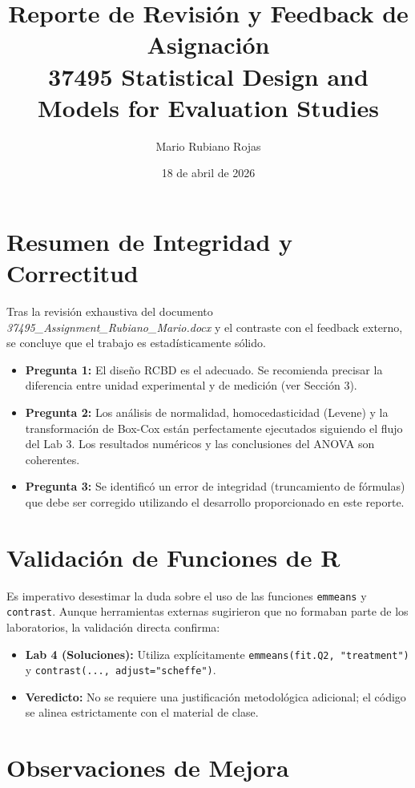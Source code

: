 \documentclass[11pt,a4paper]{article}
\title{Reporte de Revisi\'on y Feedback de Asignaci\'on \\ \large 37495 Statistical Design and Models for Evaluation Studies}
\author{Mario Rubiano Rojas}
\date{18 de abril de 2026}
\begin{document}
\maketitle

\section{Resumen de Integridad y Correctitud}
Tras la revisi\'on exhaustiva del documento \textit{37495\_Assignment\_Rubiano\_Mario.docx} y el contraste con el feedback externo, se concluye que el trabajo es estad\'isticamente s\'olido.

\begin{itemize}
    \item \textbf{Pregunta 1:} El dise\~no RCBD es el adecuado. Se recomienda precisar la diferencia entre unidad experimental y de medici\'on (ver Secci\'on 3).
    \item \textbf{Pregunta 2:} Los an\'alisis de normalidad, homocedasticidad (Levene) y la transformaci\'on de Box-Cox est\'an perfectamente ejecutados siguiendo el flujo del Lab 3. Los resultados num\'ericos y las conclusiones del ANOVA son coherentes.
    \item \textbf{Pregunta 3:} Se identific\'o un error de integridad (truncamiento de f\'ormulas) que debe ser corregido utilizando el desarrollo proporcionado en este reporte.
\end{itemize}

\section{Validaci\'on de Funciones de R}
Es imperativo desestimar la duda sobre el uso de las funciones \texttt{emmeans} y \texttt{contrast}. Aunque herramientas externas sugirieron que no formaban parte de los laboratorios, la validaci\'on directa confirma:

\begin{itemize}
    \item \textbf{Lab 4 (Soluciones):} Utiliza expl\'icitamente \texttt{emmeans(fit.Q2, "treatment")} y \texttt{contrast(..., adjust="scheffe")}.
    \item \textbf{Veredicto:} No se requiere una justificaci\'on metodol\'ogica adicional; el c\'odigo se alinea estrictamente con el material de clase.
\end{itemize}

\section{Observaciones de Mejora}
\end{document}

